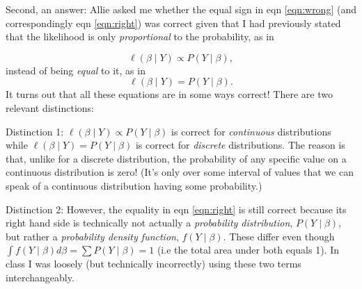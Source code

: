 \documentclass{article}
\begin{document}
Second, an answer:  Allie asked me whether the equal sign in eqn \ref{eqn:wrong} (and correspondingly eqn \ref{eqn:right}) was correct given that I had previously stated that the likelihood is only \emph{proportional} to the probability, as in

\begin{equation}
	\ell(\beta \mid Y) \propto P(Y  \mid \beta),
\end{equation}
instead of being \emph{equal} to it, as in
\begin{equation}
	\ell(\beta \mid Y)= P(Y  \mid \beta).
\end{equation}
It turns out that all these equations are in some ways correct!  There are two relevant distinctions:

Distinction 1: $\ell(\beta \mid Y) \propto P(Y  \mid \beta)$ is correct for \emph{continuous} distributions while $\ell(\beta \mid Y)= P(Y  \mid \beta)$ is correct for \emph{discrete} distributions.  The reason is that, unlike for a discrete distribution, the probability of any specific value on a continuous distribution is zero!  (It's only over some interval of values that we can speak of a continuous distribution having some probability.)

Distinction 2: However, the equality in eqn \ref{eqn:right} is still correct because its right hand side is technically not actually a \emph{probability distribution}, $P(Y \mid \beta)$, but rather a \emph{probability density function}, $f(Y \mid \beta)$.  These differ even though $\int f(Y \mid \beta) d\beta= \sum P(Y \mid \beta) = 1$ (i.e the total area under both equals 1).  In class  I was loosely (but technically incorrectly) using these two terms interchangeably. 
\end{document}
